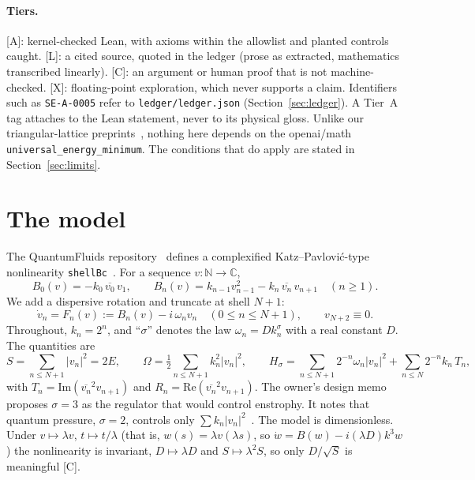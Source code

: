 \documentclass[11pt]{article}
\theoremstyle{remark}
\newcommand{\C}{\mathbb{C}}
\newcommand{\tier}[1]{\textsf{[#1]}}
\newcommand{\lean}[1]{\texttt{#1}}
\newcommand{\cj}[1]{\overline{#1}}
\begin{document}
\paragraph{Tiers.} \tier{A}: kernel-checked Lean, with axioms within the allowlist and planted controls caught.
\tier{L}: a cited source, quoted in the ledger (prose as extracted, mathematics transcribed linearly). \tier{C}: an
argument or human proof that is not machine-checked. \tier{X}: floating-point exploration, which never supports a claim.
Identifiers such as \texttt{SE-A-0005} refer to \texttt{ledger/ledger.json} (Section~\ref{sec:ledger}). A Tier~A tag
attaches to the Lean statement, never to its physical gloss. Unlike our triangular-lattice preprints~\cite{uotiered,uotextbook},
nothing here depends on the openai/math \lean{universal\_energy\_minimum}. The conditions that do apply are stated in
Section~\ref{sec:limits}.

\section{The model}\label{sec:model}

The QuantumFluids repository~\cite{qfrepo} defines a complexified Katz--Pavlovi\'c-type nonlinearity
\lean{shellBc}~\cite{waleffe}. For a sequence $v:\mathbb N\to\C$,
\begin{equation}\label{eq:B}
B_0(v)=-k_0\,\cj{v_0}\,v_1,\qquad B_n(v)=k_{n-1}v_{n-1}^2-k_n\,\cj{v_n}\,v_{n+1}\quad(n\ge1).
\end{equation}
We add a dispersive rotation and truncate at shell $N+1$:
\begin{equation}\label{eq:F}
\dot v_n=F_n(v):=B_n(v)-i\,\omega_n v_n\quad(0\le n\le N+1),\qquad v_{N+2}\equiv0 .
\end{equation}
Throughout, $k_n=2^n$, and ``$\sigma$'' denotes the law $\omega_n=Dk_n^\sigma$ with a real constant $D$. The quantities are
\[
S=\sum_{n\le N+1}|v_n|^2=2E,\qquad \Omega=\tfrac12\sum_{n\le N+1}k_n^2|v_n|^2,\qquad
H_\sigma=\sum_{n\le N+1}2^{-n}\omega_n|v_n|^2+\sum_{n\le N}2^{-n}k_n\,T_n,
\]
with $T_n=\mathrm{Im}(\cj{v_n}^2v_{n+1})$ and $R_n=\mathrm{Re}(\cj{v_n}^2v_{n+1})$. The owner's design memo
proposes $\sigma=3$ as the regulator that would control enstrophy. It notes that quantum pressure, $\sigma=2$, controls only
$\sum k_n|v_n|^2$~\cite{qfrepo}. The model is dimensionless. Under $v\mapsto\lambda v$, $t\mapsto t/\lambda$ (that is,
$w(s)=\lambda v(\lambda s)$, so $\dot w=B(w)-i(\lambda D)k^3w$) the nonlinearity is invariant, $D\mapsto\lambda D$ and
$S\mapsto\lambda^2S$, so only $D/\sqrt{S}$ is meaningful \tier{C}.
\end{document}

